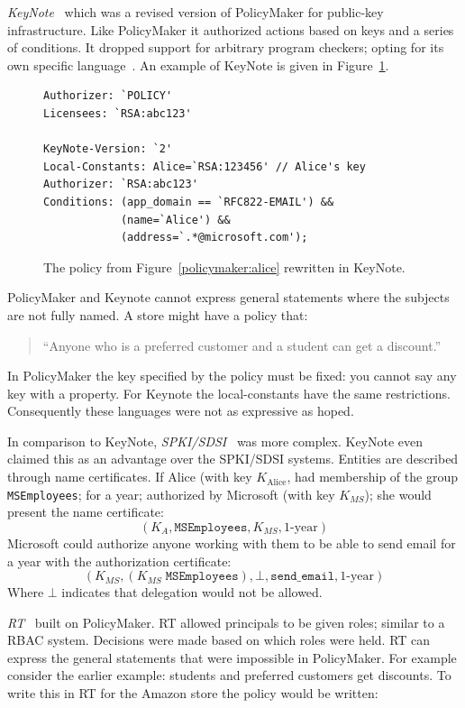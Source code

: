 \documentclass[a4paper]{article}
\begin{document}
\emph{KeyNote}~\cite{Blaze:1999fa} which was a revised version of PolicyMaker
for public-key infrastructure.  Like PolicyMaker it authorized actions based on
keys and a series of conditions.  It dropped support for arbitrary program
checkers; opting for its own specific language~\cite{Blaze:1999vc}.  An example
of KeyNote is given in Figure~\ref{keynote:example}. 

\begin{figure}
  \begin{lstlisting}[language=KeyNote]
Authorizer: `POLICY'
Licensees: `RSA:abc123'

KeyNote-Version: `2'
Local-Constants: Alice=`RSA:123456' // Alice's key
Authorizer: `RSA:abc123'
Conditions: (app_domain == `RFC822-EMAIL') &&
            (name=`Alice') &&
            (address=`.*@microsoft.com');
  \end{lstlisting}
  \caption{The policy from Figure~\ref{policymaker:alice} rewritten in KeyNote.}
  
\label{keynote:example}
\end{figure}

PolicyMaker and Keynote cannot express
general statements where the subjects are not fully named.  A store
might have a policy that:
\begin{quote} ``Anyone who is a
  preferred customer and a student can get a discount.'' 
\end{quote}  
In PolicyMaker the key specified by the policy must be fixed: you cannot say any
key with a property.  For Keynote the local-constants have the same
restrictions.  Consequently these languages were not as expressive as hoped.


In comparison to KeyNote, \emph{SPKI/SDSI}~\cite{Ellison:1999ui} was more
complex.  KeyNote even claimed this as an advantage over the SPKI/SDSI systems.
Entities are described through name certificates.  If Alice (with key
$K_\text{Alice}$, had membership of the group \texttt{MSEmployees}; for a year;
authorized by Microsoft (with key $K_{MS}$); she would present the name
certificate: \[\left(K_A,\texttt{MSEmployees},K_{MS},\text{1-year}\right)\]
Microsoft could authorize anyone working with them to be able to send email for
a year with the authorization certificate:
\[\left(K_{MS},\left(K_{MS}\;\texttt{MSEmployees}\right),\bot,\texttt{send\_email},\text{1-year}\right)\]
Where $\bot$ indicates that delegation would not be allowed.  

\emph{RT}~\cite{Li:2002if} built on PolicyMaker. RT allowed principals to be
given roles; similar to a \ac{RBAC} system. Decisions were made based on which
roles were held.
RT can express the general statements that were impossible in PolicyMaker.
For example consider the earlier example: students and preferred customers get
discounts. To write this in RT for the Amazon store the policy would be written:
\end{document}
